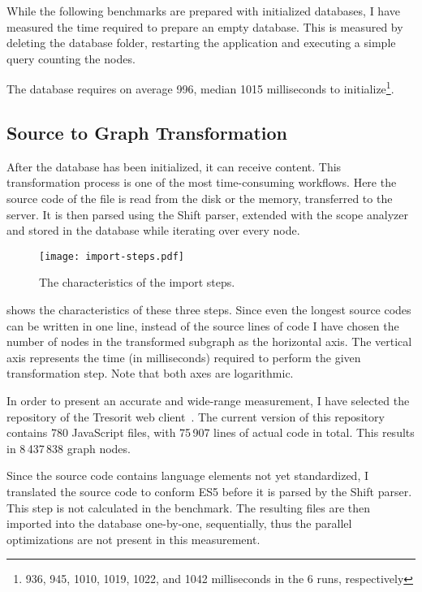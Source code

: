 While the following benchmarks are prepared with initialized databases, I have measured the time required to prepare an empty database. This is measured by deleting the database folder, restarting the application and executing a simple query counting the nodes.

The database requires on average 996, median 1015 milliseconds to initialize\footnote{936, 945, 1010, 1019, 1022, and 1042 milliseconds in the 6 runs, respectively}.

\subsection{Source to Graph Transformation}
After the database has been initialized, it can receive content. This transformation process is one of the most time-consuming workflows. Here the source code of the file is read from the disk or the memory, transferred to the server. It is then parsed using the Shift parser, extended with the scope analyzer and stored in the database while iterating over every node.

\begin{figure}[!htb]
  \centering
  \texttt{[image: import-steps.pdf]}
  \caption{The characteristics of the import steps.}
  \label{fig:import-steps}
\end{figure}

 shows the characteristics of these three steps. Since even the longest source codes can be written in one line, instead of the source lines of code I have chosen the number of nodes in the transformed subgraph as the horizontal axis. The vertical axis represents the time (in milliseconds) required to perform the given transformation step. Note that both axes are logarithmic.

In order to present an accurate and wide-range measurement, I have selected the repository of the Tresorit web client~\cite{tresorit-webclient}. The current version of this repository contains 780 JavaScript files, with 75\,907 lines of actual code in total. This results in 8\,437\,838 graph nodes.

Since the source code contains language elements not yet standardized, I translated the source code to conform ES5 before it is parsed by the Shift parser. This step is not calculated in the benchmark. The resulting files are then imported into the database one-by-one, sequentially, thus the parallel optimizations are not present in this measurement.

